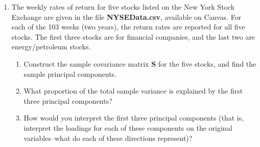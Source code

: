 \documentclass{article}
\theoremstyle{plain}
\theoremstyle{definition}
\theoremstyle{remark}
\begin{document}
\begin{enumerate}
\item The weekly rates of return for five stocks listed on the New York Stock Exchange are given in the file \textbf{NYSEData.csv}, available on Canvas.  For each of the 103 weeks (two years), the return rates are reported for all five stocks.  The first three stocks are for financial companies, and the last two are energy/petroleum stocks.

\begin{enumerate}
\item Construct the sample covariance matrix $\mathbf{S}$ for the five stocks, and find the sample principal components.
\item What proportion of the total sample variance is explained by the first three principal components?
\item How would you interpret the first three principal components (that is, interpret the loadings for each of these components on the original variables--what do each of these directions represent)?
\end{enumerate}



\end{enumerate}
\end{document}
